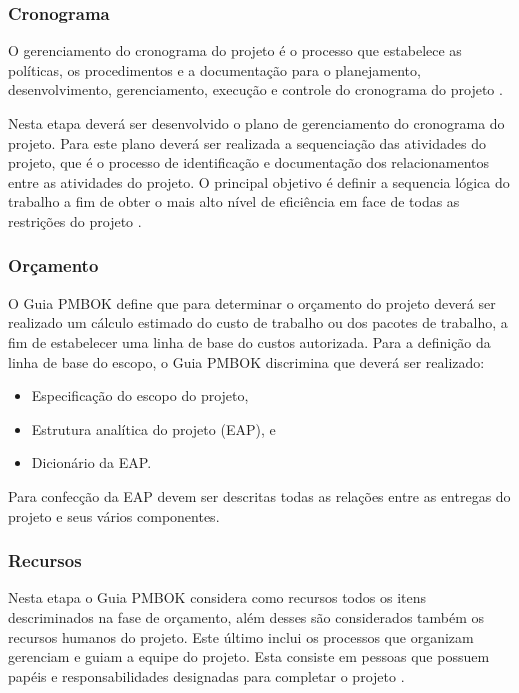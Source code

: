 \documentclass{acm_proc_article-sp}
\begin{document}
\subsubsection*{Cronograma}
O gerenciamento do cronograma do projeto é o processo que estabelece as políticas, os procedimentos e a documentação para o planejamento, desenvolvimento, gerenciamento, execução e controle do cronograma do projeto \cite{pmbok:nAgil}.

Nesta etapa deverá ser desenvolvido o plano de gerenciamento do cronograma do projeto. Para este plano deverá ser realizada a sequenciação das atividades do projeto, que é o processo de identificação e documentação dos relacionamentos entre as atividades do projeto. O principal objetivo é definir a sequencia lógica do trabalho a fim de obter o mais alto nível de eficiência em face de todas as restrições do projeto \cite{pmbok:nAgil}.

\subsubsection*{Orçamento}
O Guia PMBOK  define que para determinar o orçamento do projeto deverá ser realizado um cálculo estimado do custo de trabalho ou dos pacotes de trabalho, a fim de estabelecer uma linha de base do custos autorizada. Para a definição da linha de base do escopo, o Guia PMBOK discrimina que deverá ser realizado:

\begin{itemize}
\item Especificação do escopo do projeto,
\item Estrutura analítica do projeto (EAP), e
\item Dicionário da EAP.
\end{itemize}

Para confecção da EAP devem ser descritas todas as relações entre as entregas do projeto e seus vários componentes.

\subsubsection*{Recursos}
Nesta etapa o Guia PMBOK considera como recursos todos os itens descriminados na fase de orçamento, além desses são considerados também os recursos humanos do projeto. Este último inclui os processos que organizam gerenciam e guiam a equipe do projeto. Esta consiste em pessoas que possuem papéis e responsabilidades designadas para completar o projeto \cite{pmbok:nAgil}.
\end{document}
